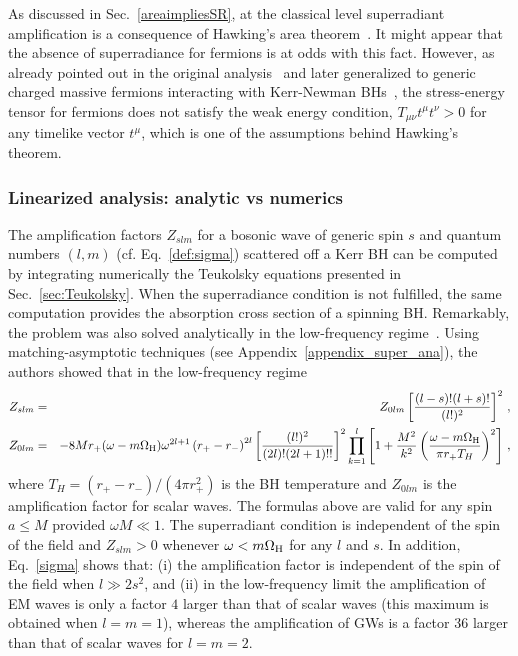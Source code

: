 \documentclass[11pt]{article}
\newcommand{\nn}{\nonumber}
\numberwithin{equation}{section} %
\begin{document}
As discussed in Sec.~\ref{areaimpliesSR}, at the classical level superradiant amplification is a consequence of Hawking's area theorem~\cite{Hawking:1971tu,Bekenstein:1973mi}. It might appear that the absence of superradiance for fermions is at odds with this fact. However, as already pointed out in the original analysis~\cite{Unruh:1973} and later generalized to generic charged massive fermions interacting with Kerr-Newman BHs~\cite{Wagh:1986cz}, the stress-energy tensor for fermions does not satisfy the weak energy condition, $T_{\mu\nu}t^\mu t^\nu>0$ for any timelike vector $t^\mu$, which is one of the assumptions behind Hawking's theorem.




\subsubsection{Linearized analysis: analytic vs numerics}\label{sec:super_anavsnum}
The amplification factors $Z_{slm}$ for a bosonic wave of generic spin $s$ and quantum numbers $(l,m)$ (cf. Eq.~\eqref{def:sigma}) scattered off a Kerr BH can be computed by integrating numerically the Teukolsky equations presented in Sec.~\ref{sec:Teukolsky}. When the superradiance condition is not fulfilled, the same computation provides the absorption cross section of a spinning BH.
%
Remarkably, the problem was also solved analytically in the low-frequency regime~\cite{Starobinski:1973,Starobinski2:1973}. Using matching-asymptotic techniques (see Appendix~\ref{appendix_super_ana}), the authors showed that in the low-frequency regime 
\begin{eqnarray}
 Z_{slm} &=& Z_{0lm}\left[\frac{(l-s)!(l+s)!}{(l!)^2}\right]^2 \,, \label{sigma}\\
 Z_{0lm} &=&-8M r_+(\omega-m\Omega_{\rm H})\omega^{2l+1}\left(r_+-r_-\right)^{2l}\left[\frac{(l!)^2}{(2l)!(2l+1)!!}\right]^2\prod_{k=1}^l\left[1+\frac{M^2}{k^2}\left(\frac{\omega-m\Omega_{\rm H}}{\pi r_+ T_H}\right)^2\right]\,, \nn\\ \label{sigma0}
\end{eqnarray}
where $T_H=(r_+-r_-)/(4\pi r_+^2)$ is the BH temperature and $Z_{0lm}$ is the amplification factor for scalar waves. The 
formulas above are valid for any spin $a\leq M$ provided $\omega M\ll1$. The superradiant condition is independent of 
the spin of the field and $Z_{slm}>0$ whenever $\omega<m\Omega_{\rm H}$ for any $l$ and $s$. In addition, 
Eq.~\eqref{sigma} shows that: (i) the amplification factor is independent of the spin of the field when $l\gg 2s^2$, and 
(ii) in the low-frequency limit the amplification of EM waves is only a factor $4$ larger than that of 
scalar waves (this maximum is obtained when $l=m=1$), whereas the amplification of GWs is a factor $36$ larger than 
that of scalar waves for $l=m=2$.
\end{document}
